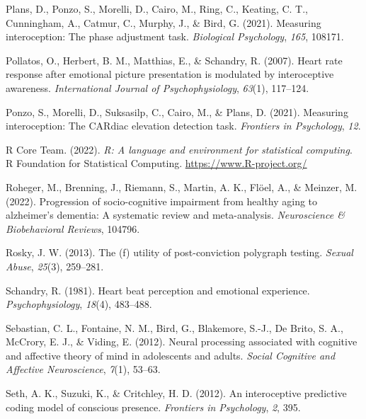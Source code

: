\documentclass[
  man,floatsintext]{apa6}
\newlength{\cslhangindent}
\newlength{\cslentryspacingunit} %
\newenvironment{CSLReferences}[2] %
 {%
  \setlength{\parindent}{0pt}
  \ifodd #1
  \let\oldpar\par
  \def\par{\hangindent=\cslhangindent\oldpar}
  \fi
  \setlength{\parskip}{#2\cslentryspacingunit}
 }%
 {}
\begin{document}
\begin{CSLReferences}{1}{0}
\leavevmode{}%
Plans, D., Ponzo, S., Morelli, D., Cairo, M., Ring, C., Keating, C. T., Cunningham, A., Catmur, C., Murphy, J., \& Bird, G. (2021). Measuring interoception: The phase adjustment task. \emph{Biological Psychology}, \emph{165}, 108171.

\leavevmode{}%
Pollatos, O., Herbert, B. M., Matthias, E., \& Schandry, R. (2007). Heart rate response after emotional picture presentation is modulated by interoceptive awareness. \emph{International Journal of Psychophysiology}, \emph{63}(1), 117--124.

\leavevmode{}%
Ponzo, S., Morelli, D., Suksasilp, C., Cairo, M., \& Plans, D. (2021). Measuring interoception: The CARdiac elevation detection task. \emph{Frontiers in Psychology}, \emph{12}.

\leavevmode{}%
R Core Team. (2022). \emph{R: A language and environment for statistical computing}. R Foundation for Statistical Computing. \url{https://www.R-project.org/}

\leavevmode{}%
Roheger, M., Brenning, J., Riemann, S., Martin, A. K., Flöel, A., \& Meinzer, M. (2022). Progression of socio-cognitive impairment from healthy aging to alzheimer's dementia: A systematic review and meta-analysis. \emph{Neuroscience \& Biobehavioral Reviews}, 104796.

\leavevmode{}%
Rosky, J. W. (2013). The (f) utility of post-conviction polygraph testing. \emph{Sexual Abuse}, \emph{25}(3), 259--281.

\leavevmode{}%
Schandry, R. (1981). Heart beat perception and emotional experience. \emph{Psychophysiology}, \emph{18}(4), 483--488.

\leavevmode{}%
Sebastian, C. L., Fontaine, N. M., Bird, G., Blakemore, S.-J., De Brito, S. A., McCrory, E. J., \& Viding, E. (2012). Neural processing associated with cognitive and affective theory of mind in adolescents and adults. \emph{Social Cognitive and Affective Neuroscience}, \emph{7}(1), 53--63.

\leavevmode{}%
Seth, A. K., Suzuki, K., \& Critchley, H. D. (2012). An interoceptive predictive coding model of conscious presence. \emph{Frontiers in Psychology}, \emph{2}, 395.


\end{CSLReferences}
\end{document}
